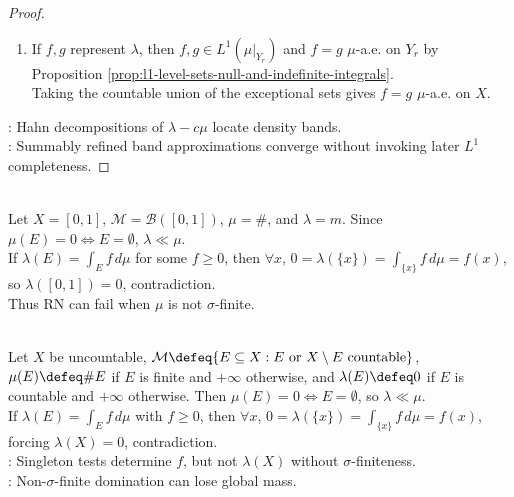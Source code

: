 \begin{theorem}
\begin{proof}
\begin{enumerate}[label=(\roman*)]
Then $\lambda(E)=\sum\limits_r\lambda(E\cap Y_r)=\int_Ef\,d\mu$; also $f<+\infty$ $\mu$-a.e. because $\int_{Y_r}f\,d\mu=\lambda(Y_r)<+\infty$ $\forall r$.
\item If $f,g$ represent $\lambda$, then $f,g\in L^1(\mu|_{Y_r})$ and $f=g$ $\mu$-a.e. on $Y_r$ by Proposition \ref{prop:l1-level-sets-null-and-indefinite-integrals}.\\
Taking the countable union of the exceptional sets gives $f=g$ $\mu$-a.e. on $X$.
\end{enumerate}
: Hahn decompositions of $\lambda-c\mu$ locate density bands.\\
: Summably refined band approximations converge without invoking later $L^1$ completeness.
\end{proof}
\end{theorem}

\begin{example} \label{ex:radon-nikodym-needs-sigma-finite-source} \\
Let $X=[0,1]$, $\mathcal{M}=\mathcal{B}([0,1])$, $\mu=\#$, and $\lambda=m$. Since $\mu(E)=0\Leftrightarrow E=\emptyset$, $\lambda\ll\mu$.\\
If $\lambda(E)=\int_E f\,d\mu$ for some $f\geq0$, then $\forall x$, $0=\lambda(\{x\})=\int_{\{x\}}f\,d\mu=f(x)$, so $\lambda([0,1])=0$, contradiction.\\
Thus RN can fail when $\mu$ is not $\sigma$-finite.
\end{example}

\begin{example} \label{ex:countable-cocountable-radon-nikodym-failure} \\
Let $X$ be uncountable, $\mathcal{M}\defeq\{E\subseteq X:E\text{ or }X\setminus E\text{ countable}\}$, $\mu(E)\defeq\#E$ if $E$ is finite and $+\infty$ otherwise, and $\lambda(E)\defeq0$ if $E$ is countable and $+\infty$ otherwise. Then $\mu(E)=0\Leftrightarrow E=\emptyset$, so $\lambda\ll\mu$.\\
If $\lambda(E)=\int_Ef\,d\mu$ with $f\geq0$, then $\forall x$, $0=\lambda(\{x\})=\int_{\{x\}}f\,d\mu=f(x)$, forcing $\lambda(X)=0$, contradiction.\\
: Singleton tests determine $f$, but not $\lambda(X)$ without $\sigma$-finiteness.\\
: Non-$\sigma$-finite domination can lose global mass.
\end{example}

